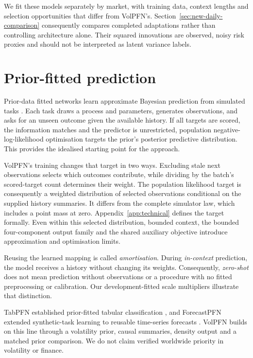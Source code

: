 We fit these models separately by market, with training data, context lengths and selection opportunities that differ from VolPFN's. Section~\ref{sec:new-daily-comparison} consequently compares completed adaptations rather than controlling architecture alone. Their squared innovations are observed, noisy risk proxies and should not be interpreted as latent variance labels.

\section{Prior-fitted prediction}
\label{sec:bg-pfn}

Prior-data fitted networks learn approximate Bayesian prediction from simulated tasks \citep{muller2022transformers}. Each task draws a process and parameters, generates observations, and asks for an unseen outcome given the available history. If all targets are scored, the information matches and the predictor is unrestricted, population negative-log-likelihood optimisation targets the prior's posterior predictive distribution. This provides the idealised starting point for the approach.

VolPFN's training changes that target in two ways. Excluding stale next observations selects which outcomes contribute, while dividing by the batch's scored-target count determines their weight. The population likelihood target is consequently a weighted distribution of selected observations conditional on the supplied history summaries. It differs from the complete simulator law, which includes a point mass at zero. Appendix~\ref{app:technical} defines the target formally. Even within this selected distribution, bounded context, the bounded four-component output family and the shared auxiliary objective introduce approximation and optimisation limits.

Reusing the learned mapping is called \emph{amortisation}. During \emph{in-context} prediction, the model receives a history without changing its weights. Consequently, \emph{zero-shot} does not mean prediction without observations or a procedure with no fitted preprocessing or calibration. Our development-fitted scale multipliers illustrate that distinction.

TabPFN established prior-fitted tabular classification \citep{hollmann2023tabpfn}, and ForecastPFN extended synthetic-task learning to reusable time-series forecasts \citep{dooley2023forecastpfn}. VolPFN builds on this line through a volatility prior, causal summaries, density output and a matched prior comparison. We do not claim verified worldwide priority in volatility or finance.

